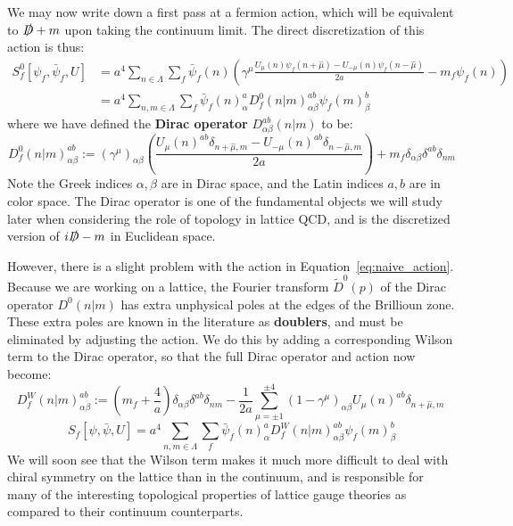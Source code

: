 \documentclass[11pt, oneside]{article}   	%
\theoremstyle{definition}
\begin{document}
We may now write down a first pass at a fermion action, which will be equivalent to $\slashed D + m$ upon taking the continuum limit. 
The direct discretization of this action is thus:
\begin{align}
	S_f^0[\psi_f, \bar\psi_f, U] &= a^4\sum_{n\in\Lambda}\sum_f \bar\psi_f(n)\left(\gamma^\mu\frac{U_\mu(n)\psi_f(n + \hat\mu) - U_{-\mu}(n)\psi_f(n - \hat\mu)}{2a} - m_f\psi_f(n)\right) 
	\\
	&= a^4\sum_{n, m\in\Lambda}\sum_f \bar\psi_f(n)_{\alpha}^a D_{f}^0(n | m)_{\alpha\beta}^{ab}\psi_f(m)_{\beta}^b~
	\label{eq:naive_action}
\end{align}
where we have defined the \textbf{Dirac operator} $D_{\alpha\beta}^{ab}(n | m)$ to be:
\begin{equation}
	D_f^0(n | m)_{\alpha\beta}^{ab} := (\gamma^\mu)_{\alpha\beta} \left(\frac{U_\mu(n)^{ab} \delta_{n + \hat\mu, m} - U_{-\mu}(n)^{ab} \delta_{n - \hat{\mu}, m}}{2a}\right) 
	+ m_f\delta_{\alpha\beta}\delta^{ab}\delta_{nm}
\end{equation}
Note the Greek indices $\alpha, \beta$ are in Dirac space, and the Latin indices $a, b$ are in color space. The Dirac operator 
is one of the fundamental objects we will study later when considering the role of topology in lattice QCD, and is the discretized 
version of $i\slashed D - m$ in Euclidean space. 

However, there is a slight problem with the action in Equation~\ref{eq:naive_action}. Because we are working on a lattice, the 
Fourier transform $\tilde D^0(p)$ of the Dirac operator $D^0(n | m)$ has extra unphysical poles at the edges of the Brillioun zone. 
These extra poles are known in the literature as \textbf{doublers}, and must be eliminated by adjusting the action. We do this by 
adding a corresponding Wilson term to the Dirac operator, so that the full Dirac operator and action now become:
\begin{equation}
	D_f^W(n | m)_{\alpha\beta}^{ab} := \left(m_f + \frac{4}{a}\right)\delta_{\alpha\beta}\delta^{ab}\delta_{nm} - \frac{1}{2a}\sum_{\mu = \pm 1}^{\pm 4} (1 - \gamma^\mu)_{\alpha
	\beta} U_\mu(n)^{ab}\delta_{n + \hat{\mu}, m}~
	\label{eq:dirac_operator}
\end{equation}
\begin{equation}
	S_f[\psi, \bar\psi, U] = a^4\sum_{n, m\in\Lambda}\sum_f \bar\psi_f(n)_{\alpha}^a D_f^W(n | m)_{\alpha\beta}^{ab}\psi_f(m)_{\beta}^b
\end{equation}
We will soon see that the Wilson term makes it much more difficult to deal with chiral symmetry on the lattice than in the continuum, 
and is responsible for many of the interesting topological properties of lattice gauge theories as compared to their continuum counterparts. 
\end{document}
